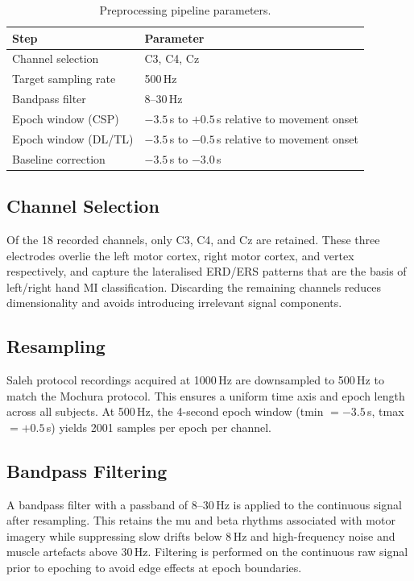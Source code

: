 \documentclass[english, bc, kiv, he, iso690alph, pdf]{fasthesis}
\begin{document}
\begin{table}[ht]
    \centering
    \caption{Preprocessing pipeline parameters.}
    \label{tab:preprocessing}
    \begin{tabular}{ll}
        \hline
        \textbf{Step} & \textbf{Parameter} \\
        \hline
        Channel selection   & C3, C4, Cz \\
        Target sampling rate & 500\,Hz \\
        Bandpass filter      & 8--30\,Hz \\
        Epoch window (CSP)   & $-3.5$\,s to $+0.5$\,s relative to movement onset \\
        Epoch window (DL/TL) & $-3.5$\,s to $-0.5$\,s relative to movement onset \\
        Baseline correction  & $-3.5$\,s to $-3.0$\,s \\
        \hline
    \end{tabular}
\end{table}

\subsection{Channel Selection}

Of the 18 recorded channels, only C3, C4, and Cz are retained. These three electrodes overlie the left motor cortex, right motor cortex, and vertex respectively, and capture the lateralised ERD/ERS patterns that are the basis of left/right hand MI classification. Discarding the remaining channels reduces dimensionality and avoids introducing irrelevant signal components.

\subsection{Resampling}

Saleh protocol recordings acquired at 1000\,Hz are downsampled to 500\,Hz to match the Mochura protocol. This ensures a uniform time axis and epoch length across all subjects. At 500\,Hz, the 4-second epoch window (tmin $= -3.5$\,s, tmax $= +0.5$\,s) yields 2001 samples per epoch per channel.

\subsection{Bandpass Filtering}

A bandpass filter with a passband of 8--30\,Hz is applied to the continuous signal after resampling. This retains the mu and beta rhythms associated with motor imagery while suppressing slow drifts below 8\,Hz and high-frequency noise and muscle artefacts above 30\,Hz. Filtering is performed on the continuous raw signal prior to epoching to avoid edge effects at epoch boundaries.
\end{document}
